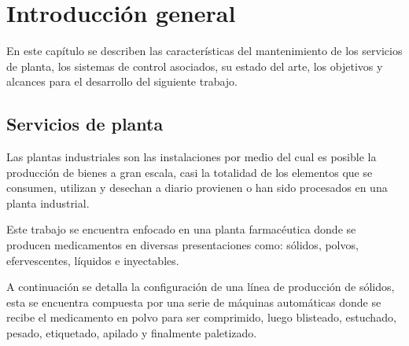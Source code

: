 
\chapter{Introducción general} %

\label{Chapter1} %
\label{IntroGeneral}


\newcommand{\keyword}[1]{\textbf{#1}}
\newcommand{\tabhead}[1]{\textbf{#1}}
\newcommand{\code}[1]{\texttt{#1}}
\newcommand{\file}[1]{\texttt{\bfseries#1}}
\newcommand{\option}[1]{\texttt{\itshape#1}}
\newcommand{\grados}{$^{\circ}$}



En este capítulo se describen las características del mantenimiento de los servicios de planta, los sistemas de control asociados, su estado del arte, los objetivos y alcances para el desarrollo del siguiente trabajo.

\section{Servicios de planta}

Las plantas industriales son las instalaciones por medio del cual es posible la producción de bienes a gran escala, casi la totalidad de los elementos que se consumen, utilizan y desechan a diario provienen o han sido procesados en una planta industrial. 

Este trabajo se encuentra enfocado en una planta farmacéutica donde se producen medicamentos en diversas presentaciones como: sólidos, polvos, efervescentes, líquidos e inyectables.

A continuación se detalla la configuración de una línea de producción de sólidos, esta se encuentra compuesta por una serie de máquinas automáticas donde se recibe el medicamento en polvo para ser comprimido, luego blisteado, estuchado, pesado, etiquetado, apilado y finalmente paletizado.

